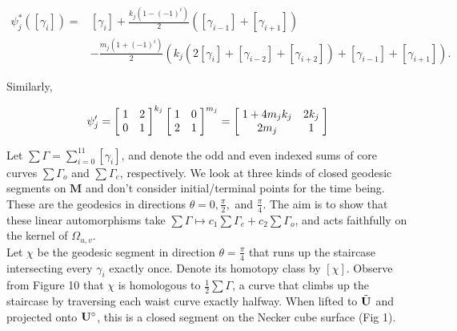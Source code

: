 \documentclass[]{article}
\def\bM{\mathbf{M}}
\begin{document}
\begin{align*}
\psi_j^*([\gamma_i])=&[\gamma_i]+\frac{k_j(1-(-1)^i)}{2}([\gamma_{i-1}]+[\gamma_{i+1}])\\&-\frac{m_j(1+(-1)^i)}{2}(k_j(2[\gamma_i]+[\gamma_{i-2}]+[\gamma_{i+2}]) +[\gamma_{i-1}]+[\gamma_{i+1}]).
\end{align*}

\noindent Similarly,

\begin{align*}
\psi_j'=\left[ \hspace{1mm} \begin{matrix}
				1 &   2\\
				0 & 1
			\end{matrix}\hspace{1mm}\right]^{k_j}\left[ \hspace{1mm} \begin{matrix}
							1 &   0\\
							2 & 1
						\end{matrix}\hspace{1mm}\right]^{m_j}=\left[ \hspace{1mm} \begin{matrix}
										1+4m_jk_j &   2k_j\\
										2m_j & 1
									\end{matrix}\hspace{1mm}\right]
\end{align*}


\noindent Let $\sum\Gamma=\sum_{i=0}^{11}[\gamma_i]$, and denote the odd and even indexed sums of core curves $\sum\Gamma_o$ and $\sum\Gamma_e$, respectively. We look at three kinds of closed geodesic segments on $\bM$ and don't consider initial/terminal points for the time being. These are the geodesics in directions $\theta=0,\frac{\pi}{2},$ and $\frac{\pi}{4}$. The aim is to show that these linear automorphisms take $\sum\Gamma\mapsto c_1\sum\Gamma_e+c_2\sum\Gamma_o$, and acts faithfully on the kernel of $\Omega_{u,v}$. \\



\noindent Let $\chi$ be the geodesic segment in direction $\theta=\frac{\pi}{4}$ that runs up the staircase intersecting every $\gamma_i$ exactly once. Denote its homotopy class by $[\chi]$. Observe from Figure 10 that $\chi$ is homologous to $\frac{1}{2}\sum\Gamma$, a curve that climbs up the staircase by traversing each waist curve exactly halfway. When lifted to $\tilde{\mathbf{U}}$ and projected onto $\mathbf{U}^\circ$, this is a closed segment on the Necker cube surface (Fig 1).
\end{document}
